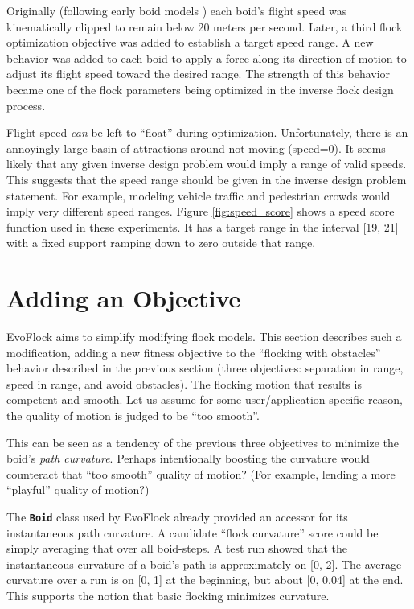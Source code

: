 \documentclass[letterpaper]{article}
\newcommand{\code}[1]{\textbf{\small \texttt{#1}}}
\begin{document}
Originally (following early boid models \citep{reynolds_flocks_1987}) each boid's flight speed was kinematically clipped to remain below 20 meters per second. Later, a third flock optimization objective was added to establish a target speed range. A new behavior was added to each boid to apply a force along its direction of motion to adjust its flight speed toward the desired range. The strength of this behavior became one of the flock parameters being optimized in the inverse flock design process.

Flight speed \textit{can} be left to ``float'' during optimization. Unfortunately, there is an annoyingly large basin of attractions around not moving (speed=0). It seems likely that any given inverse design problem would imply a range of valid speeds. This suggests that the speed range should be given in the inverse design problem statement. For example, modeling vehicle traffic and pedestrian crowds would imply very different speed ranges. Figure \ref{fig:speed_score} shows a speed score function used in these experiments. It has a target range in the interval [19, 21] with a fixed support ramping down to zero outside that range.


\section{Adding an Objective}
\label{sec:add_objective}

EvoFlock aims to simplify modifying flock models. This section describes such a modification, adding a new fitness objective to the ``flocking with obstacles'' behavior described in the previous section (three objectives: separation in range, speed in range, and avoid obstacles). The flocking motion that results is competent and smooth. Let us assume for some user/application-specific reason, the quality of motion is judged to be ``too smooth''. 

This can be seen as a tendency of the previous three objectives to minimize the boid's \textit{path curvature}. Perhaps intentionally boosting the curvature would counteract that ``too smooth'' quality of motion? (For example, lending a more ``playful'' quality of motion?)

The \code{Boid} class used by EvoFlock already provided an accessor for its instantaneous path curvature. A candidate ``flock curvature'' score could be simply averaging that over all boid-steps. A test run showed that the instantaneous curvature of a boid's path is approximately on [0, 2]. The average curvature over a run is on [0, 1] at the beginning, but about [0, 0.04] at the end. This supports the notion that basic flocking minimizes curvature.
\end{document}
